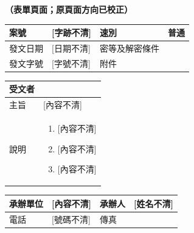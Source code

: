 \documentclass[UTF8,10pt,a4paper,fontset=fandol]{ctexart}
\newcommand{\fieldvalue}[1]{#1}
\newcommand{\handwritten}[1]{#1}
\begin{document}
\newpage

\begin{center}
\textbf{（表單頁面；原頁面方向已校正）}
\end{center}

\begin{tabularx}{\textwidth}{|l|X|l|X|}
\hline
案號 & 
\fieldvalue{\handwritten{[字跡不清]}} &
速別 & 普通 \\
\hline
發文日期 & 
\fieldvalue{\handwritten{[日期不清]}} &
密等及解密條件 & \\
\hline
發文字號 & 
\fieldvalue{\handwritten{[字號不清]}} &
附件 & \\
\hline
\end{tabularx}

\vspace{0.5em}

\begin{tabularx}{\textwidth}{|p{}|X|}
\hline
受文者 & \\
\hline
主旨 &
\fieldvalue{\handwritten{[內容不清]}} \\
\hline
說明 &
\begin{enumerate}
\item
\fieldvalue{\handwritten{[內容不清]}}
\item
\fieldvalue{\handwritten{[內容不清]}}
\item
\fieldvalue{\handwritten{[內容不清]}}
\end{enumerate}
\\
\hline
\end{tabularx}

\vspace{0.5em}

\begin{tabularx}{\textwidth}{|p{}|X|p{}|X|}
\hline
承辦單位 & 
\fieldvalue{\handwritten{[內容不清]}} &
承辦人 & 
\fieldvalue{\handwritten{[姓名不清]}} \\
\hline
電話 & 
\fieldvalue{\handwritten{[號碼不清]}} &
傳真 & \\
\hline
\end{tabularx}
\end{document}
